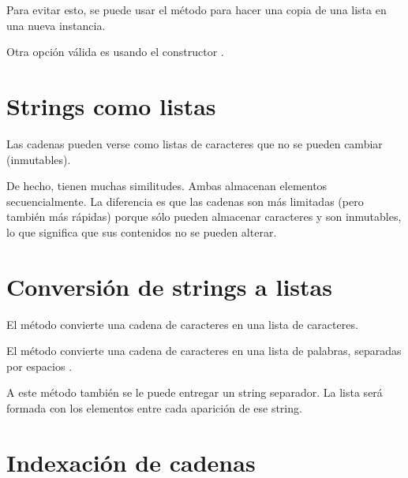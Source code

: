 Para evitar esto, se puede usar el método  para hacer una copia de una lista en una nueva instancia.


Otra opción válida es usando el constructor .


\section{Strings como listas}

Las cadenas pueden verse como listas de caracteres que no se pueden cambiar (inmutables).


De hecho, tienen muchas similitudes.
Ambas almacenan elementos secuencialmente.
La diferencia es que las cadenas son más limitadas (pero también más rápidas) porque sólo pueden almacenar caracteres y son inmutables, lo que significa que sus contenidos no se pueden alterar.

\section{Conversión de strings a listas}

El método  convierte una cadena de caracteres en una lista de caracteres.


El método  convierte una cadena de caracteres en una lista de palabras, separadas por espacios \ttt{\qq  \qq}.


A este método también se le puede entregar un string separador.
La lista será formada con los elementos entre cada aparición de ese string.


\section{Indexación de cadenas}

